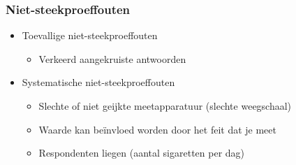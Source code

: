 \documentclass[aspectratio=169]{beamer}
\begin{document}
\begin{frame}
  \frametitle{Niet-steekproeffouten}
  \begin{itemize}
    \item<+-> Toevallige niet-steekproeffouten
    \begin{itemize}
      \item Verkeerd aangekruiste antwoorden
    \end{itemize}
    \item<+-> Systematische niet-steekproeffouten
    \begin{itemize}
      \item Slechte of niet geijkte meetapparatuur (slechte weegschaal)
      \item Waarde kan beïnvloed worden door het feit dat je meet
      \item Respondenten liegen (aantal sigaretten per dag)
    \end{itemize}
  \end{itemize}
\end{frame}
\end{document}
